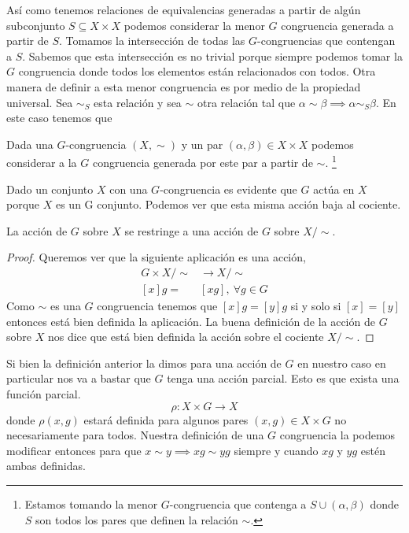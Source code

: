 \documentclass[tesis.tex]{subfiles}
\begin{document}
Así como tenemos relaciones de equivalencias generadas a partir de algún subconjunto $S \subseteq X \times X$ podemos considerar la menor $G$ congruencia generada a partir de $S$.
Tomamos la intersección de todas las $G$-congruencias que contengan a $S$. 
Sabemos que esta intersección es no trivial porque siempre podemos tomar la $G$ congruencia donde todos los elementos están relacionados con todos.
Otra manera de definir a esta menor congruencia es por medio de la propiedad universal.
Sea $\sim_S$ esta relación y sea $\sim$ otra relación tal que $\alpha \sim \beta \implies \alpha \sim_S \beta$. 
En este caso tenemos que


\begin{deff}
	Dada una $G$-congruencia $(X, \sim)$ y un par $(\alpha, \beta) \in X \times X$ podemos considerar a la $G$ congruencia generada por este par a partir de $\sim$.
	\footnote{Estamos tomando la menor $G$-congruencia que contenga a $S \cup (\alpha, \beta)$ donde $S$ son todos los pares que definen la relación $\sim$.}
\end{deff}

Dado un conjunto $X$ con una $G$-congruencia es evidente que $G$ actúa en $X$ porque $X$ es un G conjunto. 
Podemos ver que esta misma acción baja al cociente.
\begin{lema}\label{lema-accion-GCong-cociente}
	La acción de $G$ sobre $X$ se restringe a una acción de $G$ sobre $X / \sim.$
\end{lema}
\begin{proof}
	Queremos ver que la siguiente aplicación es una acción,
	\begin{align*}
	G \times X/\sim &\to X/ \sim \\
	[x]g =& [xg], \ \forall g \in G
	\end{align*}
	 Como $\sim$ es una $G$ congruencia tenemos que $[x]g = [y]g$ si y solo si $[x] = [y]$ entonces está bien definida la aplicación.
	 La buena definición de la acción de $G$ sobre $X$ nos dice que está bien definida la acción sobre el cociente $X/\sim$.
\end{proof}

Si bien la definición anterior la dimos para una acción de $G$ en nuestro caso en particular nos va a bastar que $G$ tenga una acción parcial. 
Esto es que exista una función parcial.
\begin{equation*}
\rho: X \times G \to X
\end{equation*}
donde $\rho(x,g)$ estará definida para algunos pares $(x,g) \in X \times G$ no necesariamente para todos.
Nuestra definición de una $G$ congruencia la podemos modificar entonces para que  $x \sim y \implies xg \sim yg$ siempre y cuando $xg$ y $yg$ estén ambas definidas.
\end{document}
